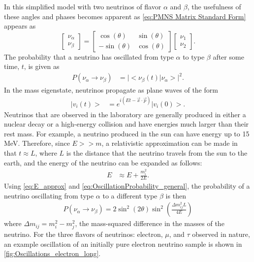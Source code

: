 In this simplified model with two neutrinos of flavor $\alpha$ and $\beta$, the usefulness of these angles and phases becomes apparent as \autoref{eq:PMNS Matrix Standard Form} appears as
\begin{equation}
\begin{bmatrix}
\nu_\alpha \\
\nu_\beta 
\end{bmatrix}
=
\begin{bmatrix}
\cos(\theta) & \sin(\theta) \\
-\sin(\theta) & \cos(\theta) 
\end{bmatrix}
\begin{bmatrix}
\nu_1 \\
\nu_2 
\end{bmatrix}.
\end{equation}
The probability that a neutrino has oscillated from type $\alpha$ to type $\beta$ after some time, $t$, is given as 
\begin{align}
P(\nu_\alpha\rightarrow\nu_\beta) &= \lvert<\nu_\beta(t)| \nu_\alpha>\rvert^2.
\end{align}
In the mass eigenstate, neutrinos propagate as plane waves of the form
\begin{align}
|v_i(t)>&=e^{i(Et-\vec{x}\cdot\vec{p})}|v_i(0)>.
\label{eq:OscillationProbability_general}
\end{align}
Neutrinos that are observed in the laboratory are generally produced in either a nuclear decay or a high-energy collision and have energies much larger than their rest mass.
For example, a neutrino produced in the sun can have energy up to 15 MeV.
Therefore, since $E >> m$, a relativistic approximation can be made in that $t\approx L$, where $L$ is the distance that the neutrino travels from the sun to the earth, and the energy of the neutrino can be expanded as follows:
\begin{align}
E &\approx E+\frac{m_i^2}{2E}.
\label{eq:E_approx}
\end{align}
Using \autoref{eq:E_approx} and \autoref{eq:OscillationProbability_general}, the probability of a neutrino oscillating from type $\alpha$ to a different type $\beta$ is then
\begin{align}
P(\nu_\alpha\rightarrow\nu_\beta) = 2 \sin^2(2\theta)\sin^2(\frac{\Delta m_{ij}^2L}{4E})
\label{eq:OscillationProbability_2nu}
\end{align}
where $\Delta m_{ij} = m_i^2 - m_j^2$, the mass-squared difference in the masses of the neutrino. For the three flavors of neutrinos: electron, $\mu$, and $\tau$ observed in nature, an example oscillation of an initially pure electron neutrino sample is shown in \autoref{fig:Oscillations_electron_long}.
